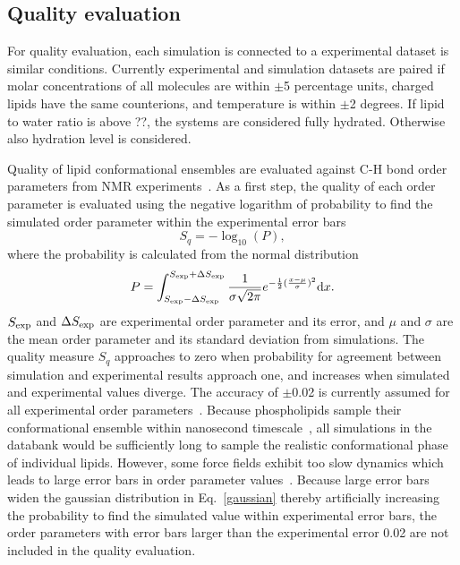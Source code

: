 \documentclass[fleqn,10pt]{wlscirep}
\begin{document}
\subsection{Quality evaluation}

For quality evaluation, each simulation is connected to a experimental dataset is similar conditions. Currently experimental and simulation datasets are paired if molar concentrations of all molecules are within $\pm$5 percentage units, charged lipids have the same counterions, and temperature is within $\pm$2 degrees. If lipid to water ratio is above ??, the systems are considered fully hydrated. Otherwise also hydration level is considered.

Quality of lipid conformational ensembles are evaluated against C-H bond order parameters from NMR experiments~\cite{ollila16}. As a first step, the quality of each order parameter is evaluated using the negative logarithm of probability to find the simulated order parameter within the experimental error bars
\begin{equation}
    S_q = -\log_{10}(P),    
\end{equation}
where the probability is calculated from the normal distribution
\begin{equation}\label{gaussian}
    P = \int_{S_{\rm exp}-\Delta S_{\rm exp}}^{S_{\rm exp}+
    \Delta S_{\rm exp}}  \frac{1}{\sigma \sqrt{2\pi}} e^{-\frac{1}{2}(\frac{x-\mu}{\sigma})^2} {\rm d}x.
\end{equation}
$S_{\rm exp}$ and $\Delta S_{\rm exp}$ are experimental order parameter and its error, and $\mu$ and $\sigma$ are the mean order parameter and its standard deviation from simulations. The quality measure $S_q$ approaches to zero when probability for agreement between simulation and experimental results approach one, and increases when simulated and experimental values diverge. The accuracy of $\pm$0.02 is currently assumed for all experimental order parameters~\cite{ollila16}. Because phospholipids sample their conformational ensemble within nanosecond timescale~\cite{ferreira15}, all simulations in the databank would be sufficiently long to sample the realistic conformational phase of individual lipids. However, some force fields exhibit too slow dynamics which leads to large error bars in order parameter values~\cite{antila21a}. Because large error bars widen the gaussian distribution in Eq.~\ref{gaussian} thereby artificially increasing the probability to find the simulated value within experimental error bars, the order parameters with error bars larger than the experimental error 0.02 are not included in the quality evaluation.
\end{document}
